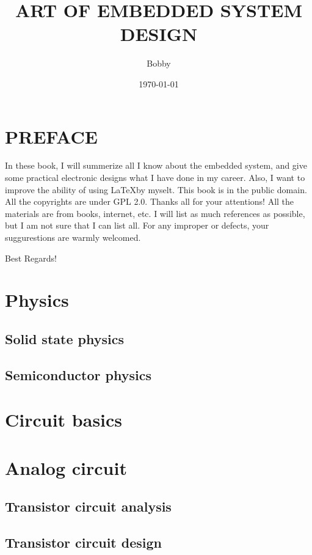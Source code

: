 \documentclass[UTF8]{book}
\title{ART OF EMBEDDED SYSTEM DESIGN }
\author{Bobby}
\date{\today}
\begin{document}
	\maketitle
	\frontmatter
	\part{PREFACE}
	
	In these book, I will summerize all I know about the embedded system, and give some practical electronic designs what I have done in my career. Also, I want to improve the ability of using \LaTeX by myselt. This book is in the public domain. All the copyrights are under GPL 2.0.
	Thanks all for your attentions! All the materials are from books, internet, etc. I will list as much references as possible, but I am not sure that I can list all. For any improper or defects, your suggurestions are warmly welcomed.
	
	Best Regards!
	

	\tableofcontents
	
	\mainmatter
	

	\part{Physics}
	\label{Physics}
	\chapter{Solid state physics}
	\label{Solid state physics}
	\chapter{Semiconductor physics}
	\label{Semiconductor physics}
	
	
	\part{Circuit basics}
	\label{Circuit basics}
	
	\part{Analog circuit}
	\label{Analog circuit}
	\chapter{Transistor circuit analysis}
	\label{Transistor circuit analysis}
	\chapter{Transistor circuit design}
	\label{Transistor circuit design}
\end{document}
